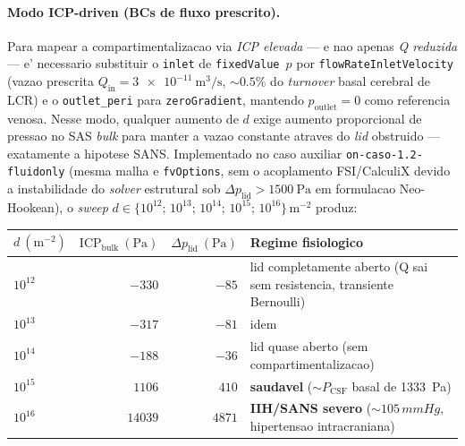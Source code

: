 \paragraph{Modo ICP-driven (BCs de fluxo prescrito).} Para mapear a compartimentalizacao via \emph{ICP elevada} --- e nao apenas \emph{Q reduzida} --- e' necessario substituir o \texttt{inlet} de \texttt{fixedValue}~$p$ por \texttt{flowRateInletVelocity} (vazao prescrita $Q_{\mathrm{in}} = \SI{3e-11}{\meter^3\per\second}$, $\sim 0.5\%$ do \emph{turnover} basal cerebral de LCR) e o \texttt{outlet\_peri} para \texttt{zeroGradient}, mantendo $p_{\mathrm{outlet}} = 0$ como referencia venosa. Nesse modo, qualquer aumento de $d$ exige aumento proporcional de pressao no SAS \emph{bulk} para manter a vazao constante atraves do \emph{lid} obstruido --- exatamente a hipotese SANS. Implementado no caso auxiliar \texttt{on-caso-1.2-fluidonly} (mesma malha e \texttt{fvOptions}, sem o acoplamento FSI/CalculiX devido a instabilidade do \emph{solver} estrutural sob $\Delta p_{\mathrm{lid}} > \SI{1500}{\pascal}$ em formulacao Neo-Hookean), o \emph{sweep} $d \in \{10^{12};\, 10^{13};\, 10^{14};\, 10^{15};\, 10^{16}\}\,\si{\meter^{-2}}$ produz:
\begin{center}
\begin{tabular}{lrrl}
\toprule
$d~(\si{\meter^{-2}})$ & $\mathrm{ICP_{bulk}}~(\si{\pascal})$ & $\Delta p_{\mathrm{lid}}~(\si{\pascal})$ & Regime fisiologico \\
\midrule
$10^{12}$ & $-330$ & $-85$ & lid completamente aberto (Q sai sem resistencia, transiente Bernoulli) \\
$10^{13}$ & $-317$ & $-81$ & idem \\
$10^{14}$ & $-188$ & $-36$ & lid quase aberto (sem compartimentalizacao) \\
$10^{15}$ & $1106$ & $410$ & \textbf{saudavel} ($\sim P_{\mathrm{CSF}}$ basal de \SI{1333}{\pascal}) \\
$10^{16}$ & $14039$ & $4871$ & \textbf{IIH/SANS severo} ($\sim 105\,\si{mmHg}$, hipertensao intracraniana) \\
\bottomrule
\end{tabular}
\end{center}
